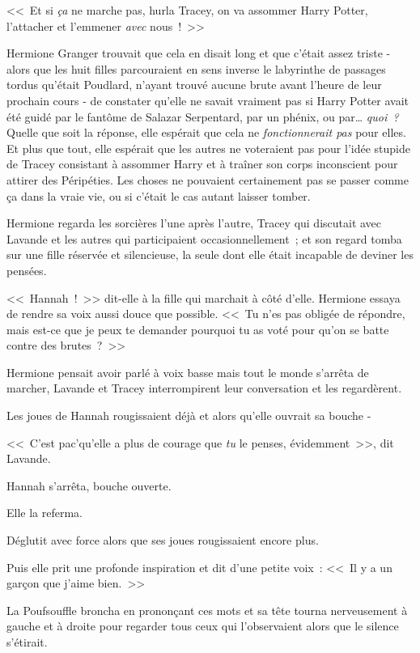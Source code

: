 <<~Et si \emph{ça} ne marche pas, hurla Tracey, on va assommer Harry Potter, l'attacher et l'emmener \emph{avec} nous~!~>>

\later

Hermione Granger trouvait que cela en disait long et que c'était assez triste - alors que les huit filles parcouraient en sens inverse le labyrinthe de passages tordus qu'était Poudlard, n'ayant trouvé aucune brute avant l'heure de leur prochain cours - de constater qu'elle ne savait vraiment pas si Harry Potter avait été guidé par le fantôme de Salazar Serpentard, par un phénix, ou par… \emph{quoi~?} Quelle que soit la réponse, elle espérait que cela ne \emph{fonctionnerait pas} pour elles. Et plus que tout, elle espérait que les autres ne voteraient pas pour l'idée stupide de Tracey consistant à assommer Harry et à traîner son corps inconscient pour attirer des Péripéties. Les choses ne pouvaient certainement pas se passer comme ça dans la vraie vie, ou si c'était le cas autant laisser tomber.

Hermione regarda les sorcières l'une après l'autre, Tracey qui discutait avec Lavande et les autres qui participaient occasionnellement~; et son regard tomba sur une fille réservée et silencieuse, la seule dont elle était incapable de deviner les pensées.

<<~Hannah~!~>> dit-elle à la fille qui marchait à côté d'elle. Hermione essaya de rendre sa voix aussi douce que possible. <<~Tu n'es pas obligée de répondre, mais est-ce que je peux te demander pourquoi tu as voté pour qu'on se batte contre des brutes~?~>>

Hermione pensait avoir parlé à voix basse mais tout le monde s'arrêta de marcher, Lavande et Tracey interrompirent leur conversation et les regardèrent.

Les joues de Hannah rougissaient déjà et alors qu'elle ouvrait sa bouche -

<<~C'est pac'qu'elle a plus de courage que \emph{tu} le penses, évidemment~>>, dit Lavande.

Hannah s'arrêta, bouche ouverte.

Elle la referma.

Déglutit avec force alors que ses joues rougissaient encore plus.

Puis elle prit une profonde inspiration et dit d'une petite voix~: <<~Il y a un garçon que j'aime bien.~>>

La Poufsouffle broncha en prononçant ces mots et sa tête tourna nerveusement à gauche et à droite pour regarder tous ceux qui l'observaient alors que le silence s'étirait.


